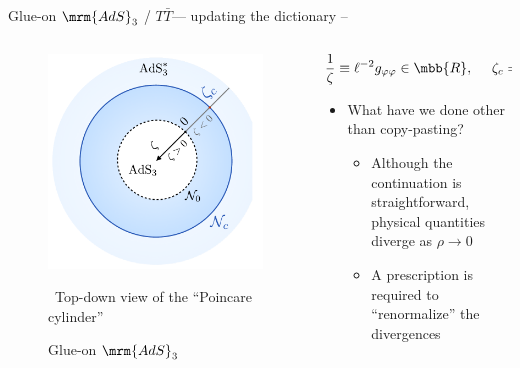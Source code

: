 \documentclass[aspectratio=169,10pt
	,noamsthm
]{beamer}
\newcommand{\TTbar}{\texorpdfstring{\ensuremath{T\bar{T}}}{TTbar}\xspace}
\begin{document}
\newcommand{\figGlueon}{
\begin{figure}[!h]
	\centering
	\includegraphics[width=.8\linewidth]{img/diagram.pdf}
	\vspace{-.3\baselineskip}
	\caption{Glue-on $\mrm{AdS}_3$}
	
	\vspace{-.3\baselineskip}
	\scriptsize\ Top-down view of the ``Poincare cylinder''
\end{figure}
}

\begin{frame}{Glue-on $\mrm{AdS}_3$ / \TTbar --- updating the dictionary}{%
	\textcite{Apolo:2023vnm} -- 
}
\begin{columns}
\begin{column}{.4\textwidth}
\figGlueon
\end{column}
\begin{column}{.6\textwidth}
\vspace{-\baselineskip}
\begin{equation}
	\frac{1}{\zeta} \equiv \ell^{-2} g_{\varphi\varphi} \in \mbb{R},
\ \quad
	\zeta_c = - \frac{c \mu}{3\ell^2} \in \mbb{R}
\end{equation}
\vspace{-.5\baselineskip}
\begin{itemize}
\item What have we done other than copy-pasting?
	\begin{itemize}
	\item Although the continuation is straightforward, physical quantities diverge as $\rho \to 0$
	
	\item A prescription is required to ``renormalize'' the divergences
	\end{itemize}
	
\end{itemize}
\end{column}
\end{columns}
\end{frame}
\end{document}
